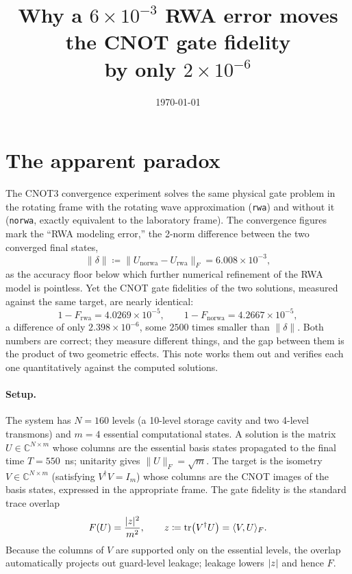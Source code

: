 \documentclass[11pt]{article}
\title{Why a $6\times10^{-3}$ RWA error moves the CNOT gate fidelity\\
by only $2\times10^{-6}$}
\author{}
\date{\today}
\newcommand{\code}[1]{\texttt{#1}}
\newcommand{\tr}{\operatorname{tr}}
\newcommand{\norm}[1]{\lVert #1 \rVert}
\DeclarePairedDelimiter{\abs}{\lvert}{\rvert}
\begin{document}
\maketitle

\section{The apparent paradox}

The CNOT3 convergence experiment solves the same physical gate problem in the
rotating frame with the rotating wave approximation (\code{rwa}) and without it
(\code{norwa}, exactly equivalent to the laboratory frame).  The convergence
figures mark the ``RWA modeling error,'' the 2-norm difference between the two
converged final states,
\begin{equation}
    \norm{\delta} \coloneqq \norm{U_{\mathrm{norwa}} - U_{\mathrm{rwa}}}_F
    = 6.008\times10^{-3},
\end{equation}
as the accuracy floor below which further numerical refinement of the RWA model
is pointless.  Yet the CNOT gate fidelities of the two solutions, measured
against the same target, are nearly identical:
\begin{equation}
    1 - F_{\mathrm{rwa}} = 4.0269\times10^{-5},
    \qquad
    1 - F_{\mathrm{norwa}} = 4.2667\times10^{-5},
\end{equation}
a difference of only $2.398\times10^{-6}$, some $2500$ times smaller than
$\norm{\delta}$.  Both numbers are correct; they measure different things, and
the gap between them is the product of two geometric effects.  This note works
them out and verifies each one quantitatively against the computed solutions.

\paragraph{Setup.}  The system has $N = 160$ levels (a 10-level storage cavity
and two 4-level transmons) and $m = 4$ essential computational states.  A
solution is the matrix $U \in \mathbb{C}^{N\times m}$ whose columns are the
essential basis states propagated to the final time $T = 550$~ns; unitarity
gives $\norm{U}_F = \sqrt{m}$.  The target is the isometry
$V \in \mathbb{C}^{N\times m}$ (satisfying $V^\dagger V = I_m$) whose columns
are the CNOT images of the basis states, expressed in the appropriate frame.
The gate fidelity is the standard trace overlap
\begin{equation} \label{eq:fidelity}
    F(U) = \frac{\abs{z}^2}{m^2},
    \qquad
    z \coloneqq \tr\bigl(V^\dagger U\bigr) = \langle V, U\rangle_F .
\end{equation}
Because the columns of $V$ are supported only on the essential levels, the
overlap automatically projects out guard-level leakage; leakage lowers
$\abs{z}$ and hence $F$.
\end{document}
